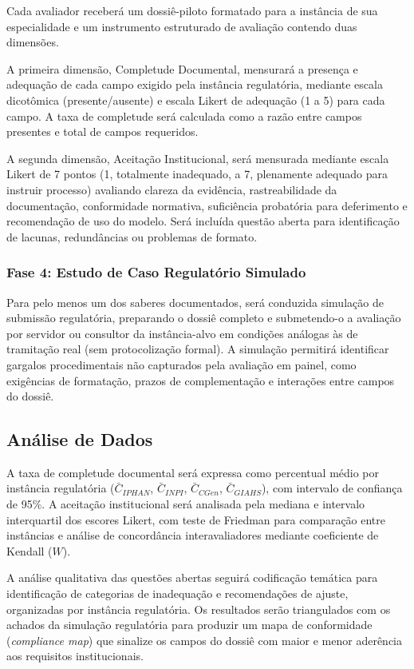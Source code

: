 Cada avaliador receberá um dossiê-piloto formatado para a instância de sua especialidade e um instrumento estruturado de avaliação contendo duas dimensões.

A primeira dimensão, Completude Documental, mensurará a presença e adequação de cada campo exigido pela instância regulatória, mediante escala dicotômica (presente/ausente) e escala Likert de adequação (1 a 5) para cada campo. A taxa de completude será calculada como a razão entre campos presentes e total de campos requeridos.

A segunda dimensão, Aceitação Institucional, será mensurada mediante escala Likert de 7 pontos (1, totalmente inadequado, a 7, plenamente adequado para instruir processo) avaliando clareza da evidência, rastreabilidade da documentação, conformidade normativa, suficiência probatória para deferimento e recomendação de uso do modelo. Será incluída questão aberta para identificação de lacunas, redundâncias ou problemas de formato.

\subsubsection{Fase 4: Estudo de Caso Regulatório Simulado}

Para pelo menos um dos saberes documentados, será conduzida simulação de submissão regulatória, preparando o dossiê completo e submetendo-o a avaliação por servidor ou consultor da instância-alvo em condições análogas às de tramitação real (sem protocolização formal). A simulação permitirá identificar gargalos procedimentais não capturados pela avaliação em painel, como exigências de formatação, prazos de complementação e interações entre campos do dossiê.

\subsection{Análise de Dados}

A taxa de completude documental será expressa como percentual médio por instância regulatória ($\bar{C}_{IPHAN}$, $\bar{C}_{INPI}$, $\bar{C}_{CGen}$, $\bar{C}_{GIAHS}$), com intervalo de confiança de 95\%. A aceitação institucional será analisada pela mediana e intervalo interquartil dos escores Likert, com teste de Friedman para comparação entre instâncias e análise de concordância interavaliadores mediante coeficiente de Kendall ($W$).

A análise qualitativa das questões abertas seguirá codificação temática para identificação de categorias de inadequação e recomendações de ajuste, organizadas por instância regulatória. Os resultados serão triangulados com os achados da simulação regulatória para produzir um mapa de conformidade (\textit{compliance map}) que sinalize os campos do dossiê com maior e menor aderência aos requisitos institucionais.

